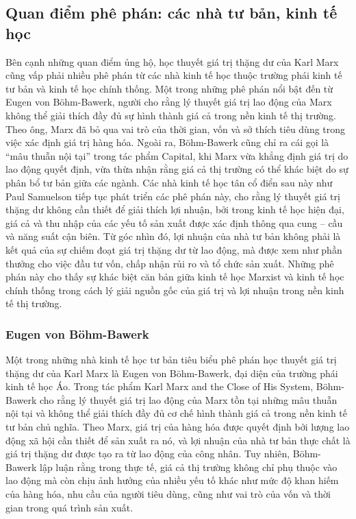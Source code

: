 \subsection{Quan điểm phê phán: các nhà tư bản, kinh tế học}
Bên cạnh những quan điểm ủng hộ, học thuyết giá trị thặng dư của Karl Marx cũng vấp phải nhiều phê phán từ các nhà kinh tế học thuộc trường phái kinh tế tư bản và kinh tế học chính thống. Một trong những phê phán nổi bật đến từ Eugen von Böhm-Bawerk, người cho rằng lý thuyết giá trị lao động của Marx không thể giải thích đầy đủ sự hình thành giá cả trong nền kinh tế thị trường.\cite{EugenCritic} Theo ông, Marx đã bỏ qua vai trò của thời gian, vốn và sở thích tiêu dùng trong việc xác định giá trị hàng hóa. Ngoài ra, Böhm-Bawerk cũng chỉ ra cái gọi là “mâu thuẫn nội tại” trong tác phẩm Capital, khi Marx vừa khẳng định giá trị do lao động quyết định, vừa thừa nhận rằng giá cả thị trường có thể khác biệt do sự phân bổ tư bản giữa các ngành. Các nhà kinh tế học tân cổ điển sau này như Paul Samuelson tiếp tục phát triển các phê phán này, cho rằng lý thuyết giá trị thặng dư không cần thiết để giải thích lợi nhuận, bởi trong kinh tế học hiện đại, giá cả và thu nhập của các yếu tố sản xuất được xác định thông qua cung – cầu và năng suất cận biên. Từ góc nhìn đó, lợi nhuận của nhà tư bản không phải là kết quả của sự chiếm đoạt giá trị thặng dư từ lao động, mà được xem như phần thưởng cho việc đầu tư vốn, chấp nhận rủi ro và tổ chức sản xuất. Những phê phán này cho thấy sự khác biệt căn bản giữa kinh tế học Marxist và kinh tế học chính thống trong cách lý giải nguồn gốc của giá trị và lợi nhuận trong nền kinh tế thị trường.

\subsubsection{Eugen von Böhm-Bawerk}
Một trong những nhà kinh tế học tư bản tiêu biểu phê phán học thuyết giá trị thặng dư của Karl Marx là Eugen von Böhm-Bawerk, đại diện của trường phái kinh tế học Áo. Trong tác phẩm Karl Marx and the Close of His System,\cite{EugenCritic} Böhm-Bawerk cho rằng lý thuyết giá trị lao động của Marx tồn tại những mâu thuẫn nội tại và không thể giải thích đầy đủ cơ chế hình thành giá cả trong nền kinh tế tư bản chủ nghĩa. Theo Marx, giá trị của hàng hóa được quyết định bởi lượng lao động xã hội cần thiết để sản xuất ra nó, và lợi nhuận của nhà tư bản thực chất là giá trị thặng dư được tạo ra từ lao động của công nhân.\cite{Capital} Tuy nhiên, Böhm-Bawerk lập luận rằng trong thực tế, giá cả thị trường không chỉ phụ thuộc vào lao động mà còn chịu ảnh hưởng của nhiều yếu tố khác như mức độ khan hiếm của hàng hóa, nhu cầu của người tiêu dùng, cũng như vai trò của vốn và thời gian trong quá trình sản xuất.

